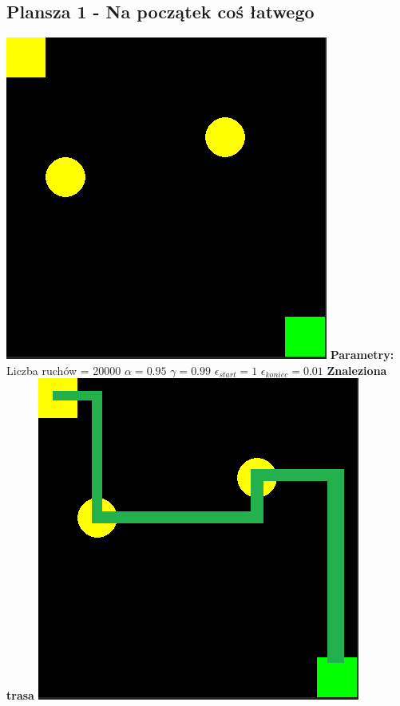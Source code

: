 \documentclass[a4paper,12pt]{article}
\begin{document}
\subsection{Plansza 1 - Na początek coś łatwego}
\includegraphics[scale=0.73]{testy/plansza1.png} \newline
\textbf{Parametry:}
Liczba ruchów = 20000
\newline \(\alpha = 0.95\)
\newline \(\gamma = 0.99\)
\newline \(\epsilon_{start} = 1\)
\newline \(\epsilon_{koniec} = 0.01\) \newpage
\textbf{\Large{Znaleziona trasa}} \newline \newline
\includegraphics[scale=0.73]{testy/plansza1trasa.png} \newline \newline
\end{document}
